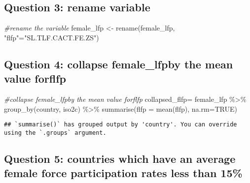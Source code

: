\documentclass[
]{article}
\newenvironment{Shaded}{\begin{snugshade}}{\end{snugshade}}
\newcommand{\AttributeTok}[1]{\textcolor[rgb]{0.77,0.63,0.00}{#1}}
\newcommand{\CommentTok}[1]{\textcolor[rgb]{0.56,0.35,0.01}{\textit{#1}}}
\newcommand{\ConstantTok}[1]{\textcolor[rgb]{0.00,0.00,0.00}{#1}}
\newcommand{\FunctionTok}[1]{\textcolor[rgb]{0.00,0.00,0.00}{#1}}
\newcommand{\NormalTok}[1]{#1}
\newcommand{\OtherTok}[1]{\textcolor[rgb]{0.56,0.35,0.01}{#1}}
\newcommand{\SpecialCharTok}[1]{\textcolor[rgb]{0.00,0.00,0.00}{#1}}
\newcommand{\StringTok}[1]{\textcolor[rgb]{0.31,0.60,0.02}{#1}}
\begin{document}
\hypertarget{question-3-rename-variable}{%
\subsection{Question 3: rename
variable}\label{question-3-rename-variable}}

\begin{Shaded}
\begin{Highlighting}[]
\CommentTok{\#rename the variable}
\NormalTok{female\_lfp }\OtherTok{\textless{}{-}} \FunctionTok{rename}\NormalTok{(female\_lfp, }\StringTok{"flfp"}\OtherTok{=}\StringTok{"SL.TLF.CACT.FE.ZS"}\NormalTok{)}
\end{Highlighting}
\end{Shaded}

\hypertarget{question-4-collapse-female_lfpby-the-mean-value-forflfp}{%
\subsection{Question 4: collapse female\_lfpby the mean value
forflfp}\label{question-4-collapse-female_lfpby-the-mean-value-forflfp}}

\begin{Shaded}
\begin{Highlighting}[]
\CommentTok{\#collapse female\_lfpby the mean value forflfp }
\NormalTok{collapsed\_flfp}\OtherTok{=}\NormalTok{ female\_lfp }\SpecialCharTok{\%\textgreater{}\%} \FunctionTok{group\_by}\NormalTok{(country, iso2c) }\SpecialCharTok{\%\textgreater{}\%} \FunctionTok{summarise}\NormalTok{(}\AttributeTok{flfp =} \FunctionTok{mean}\NormalTok{(flfp), }\AttributeTok{na.rm=}\ConstantTok{TRUE}\NormalTok{) }
\end{Highlighting}
\end{Shaded}

\begin{verbatim}
## `summarise()` has grouped output by 'country'. You can override using the `.groups` argument.
\end{verbatim}

\hypertarget{question-5-countries-which-have-an-average-female-force-participation-rates-less-than-15}{%
\subsection{Question 5: countries which have an average female force
participation rates less than
15\%}\label{question-5-countries-which-have-an-average-female-force-participation-rates-less-than-15}}
\end{document}
